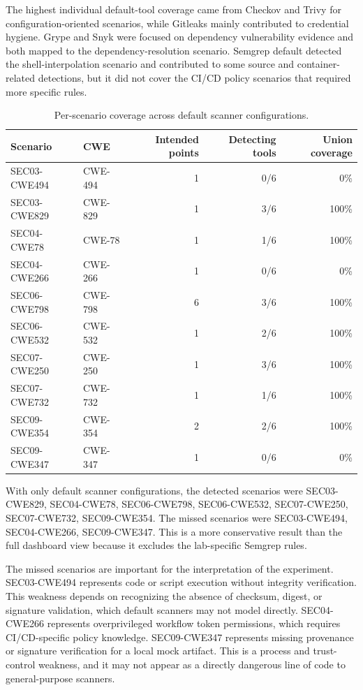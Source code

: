The highest individual default-tool coverage came from Checkov and Trivy for configuration-oriented scenarios, while Gitleaks mainly contributed to credential hygiene. Grype and Snyk were focused on dependency vulnerability evidence and both mapped to the dependency-resolution scenario. Semgrep default detected the shell-interpolation scenario and contributed to some source and container-related detections, but it did not cover the CI/CD policy scenarios that required more specific rules.

\begin{table}[H]
\centering
\caption{Per-scenario coverage across default scanner configurations.}
\label{tab:default-per-scenario-coverage-results}
\begin{tabular}{llrrr}
\hline
Scenario & CWE & Intended points & Detecting tools & Union coverage \\
\hline
SEC03-CWE494 & CWE-494 & 1 & 0/6 & 0\% \\
SEC03-CWE829 & CWE-829 & 1 & 3/6 & 100\% \\
SEC04-CWE78 & CWE-78 & 1 & 1/6 & 100\% \\
SEC04-CWE266 & CWE-266 & 1 & 0/6 & 0\% \\
SEC06-CWE798 & CWE-798 & 6 & 3/6 & 100\% \\
SEC06-CWE532 & CWE-532 & 1 & 2/6 & 100\% \\
SEC07-CWE250 & CWE-250 & 1 & 3/6 & 100\% \\
SEC07-CWE732 & CWE-732 & 1 & 1/6 & 100\% \\
SEC09-CWE354 & CWE-354 & 2 & 2/6 & 100\% \\
SEC09-CWE347 & CWE-347 & 1 & 0/6 & 0\% \\
\hline
\end{tabular}
\end{table}

With only default scanner configurations, the detected scenarios were SEC03-CWE829, SEC04-CWE78, SEC06-CWE798, SEC06-CWE532, SEC07-CWE250, SEC07-CWE732, SEC09-CWE354. The missed scenarios were SEC03-CWE494, SEC04-CWE266, SEC09-CWE347. This is a more conservative result than the full dashboard view because it excludes the lab-specific Semgrep rules.

The missed scenarios are important for the interpretation of the experiment. SEC03-CWE494 represents code or script execution without integrity verification. This weakness depends on recognizing the absence of checksum, digest, or signature validation, which default scanners may not model directly. SEC04-CWE266 represents overprivileged workflow token permissions, which requires CI/CD-specific policy knowledge. SEC09-CWE347 represents missing provenance or signature verification for a local mock artifact. This is a process and trust-control weakness, and it may not appear as a directly dangerous line of code to general-purpose scanners.

